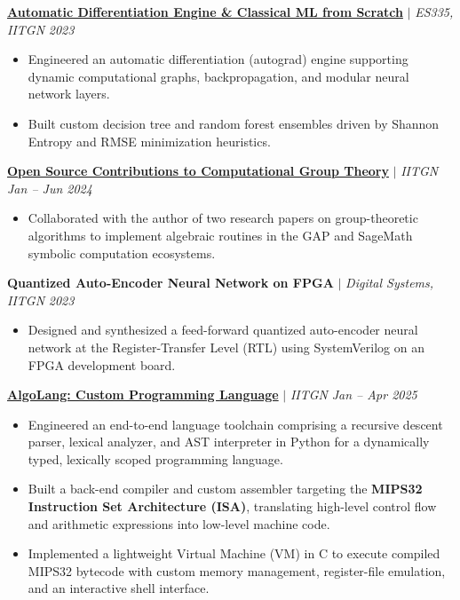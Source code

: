 \documentclass[10pt,a4paper]{article}
\newcommand{\projectheader}[3]{
  \textbf{#1} $\vert{}$ \textit{#2} \hfill \textit{#3} \vspace{2pt}
}
\begin{document}
\vspace{3pt}
\projectheader{\href{https://github.com/pranav-joshi-iitgn/ML_Journey}{Automatic Differentiation Engine \& Classical ML from Scratch}}{ES335, IITGN}{2023}
\begin{itemize}
    \item Engineered an automatic differentiation (autograd) engine supporting dynamic computational graphs, backpropagation, and modular neural network layers. 
    \item Built custom decision tree and random forest ensembles driven by Shannon Entropy and RMSE minimization heuristics.
\end{itemize}

\vspace{3pt}
\projectheader{\href{https://github.com/pranav-joshi-iitgn/Group}{Open Source Contributions to Computational Group Theory}}{IITGN}{Jan -- Jun 2024}
\begin{itemize}
    \item Collaborated with the author of two research papers on group-theoretic algorithms to implement algebraic routines in the GAP and SageMath symbolic computation ecosystems.
\end{itemize}

\vspace{3pt}
\projectheader{Quantized Auto-Encoder Neural Network on FPGA}{Digital Systems, IITGN}{2023}
\begin{itemize}
    \item Designed and synthesized a feed-forward quantized auto-encoder neural network at the Register-Transfer Level (RTL) using SystemVerilog on an FPGA development board.
\end{itemize}

\vspace{3pt}
\projectheader{\href{https://github.com/pranav-joshi-iitgn/AlgoLang}{AlgoLang: Custom Programming Language}}{IITGN}{Jan -- Apr 2025}
\begin{itemize}
    \item Engineered an end-to-end language toolchain comprising a recursive descent parser, lexical analyzer, and AST interpreter in Python for a dynamically typed, lexically scoped programming language.
    \item Built a back-end compiler and custom assembler targeting the \textbf{MIPS32 Instruction Set Architecture (ISA)}, translating high-level control flow and arithmetic expressions into low-level machine code.
    \item Implemented a lightweight Virtual Machine (VM) in C to execute compiled MIPS32 bytecode with custom memory management, register-file emulation, and an interactive shell interface.
\end{itemize}
\end{document}
